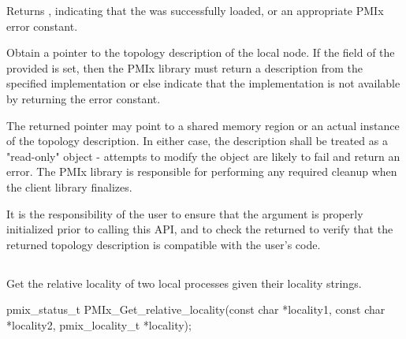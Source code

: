 Returns , indicating that the  was successfully loaded, or an appropriate \ac{PMIx} error constant.

\descr

Obtain a pointer to the topology description of the local node. If the
 field of the provided  is set, then
the \ac{PMIx} library must return a description from the specified
implementation or else indicate that the implementation is not available by
returning the  error constant.

The returned pointer may point to a shared memory region or an actual instance
of the topology description. In either case, the description shall be treated
as a "read-only" object - attempts to modify the object are likely to fail and
return an error. The \ac{PMIx} library is responsible for performing any required cleanup when the client library finalizes.

\adviceuserstart
It is the responsibility of the user to ensure that the  argument
is properly initialized prior to calling this \ac{API}, and to check the
returned  to verify that the returned topology description is
compatible with the user's code.
\adviceuserend

\subsection{}

\summary

Get the relative locality of two local processes given their locality strings.

\format

\cspecificstart
\begin{codepar}
pmix_status_t
PMIx_Get_relative_locality(const char *locality1,
                           const char *locality2,
                           pmix_locality_t *locality);
\end{codepar}
\cspecificend

\begin{arglist}
\end{arglist}

